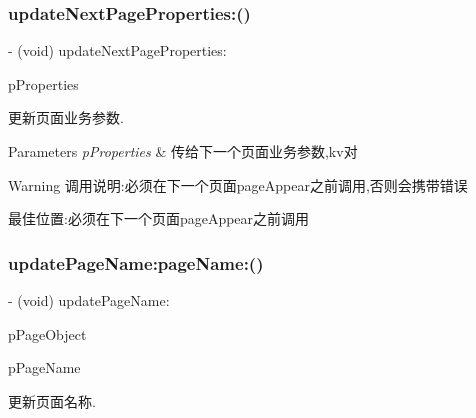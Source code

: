 \subsubsection{\texorpdfstring{update\+Next\+Page\+Properties\+:()}{updateNextPageProperties:()}}
{\footnotesize\ttfamily -\/ (void) update\+Next\+Page\+Properties\+: \begin{DoxyParamCaption}\item[{(N\+S\+Dictionary $\ast$)}]{p\+Properties }\end{DoxyParamCaption}}



更新页面业务参数. 


\begin{DoxyParams}{Parameters}
{\em p\+Properties} & 传给下一个页面业务参数,kv对\\
\hline
\end{DoxyParams}
\begin{DoxyWarning}{Warning}
调用说明\+:必须在下一个页面page\+Appear之前调用,否则会携带错误 \begin{DoxyVerb}                     最佳位置:必须在下一个页面pageAppear之前调用\end{DoxyVerb}
 
\end{DoxyWarning}
\mbox{\label{interface_u_t_tracker_af0b3ce3574a7cbf78cb880c567f9efa1}} 
\subsubsection{\texorpdfstring{update\+Page\+Name\+:page\+Name\+:()}{updatePageName:pageName:()}}
{\footnotesize\ttfamily -\/ (void) update\+Page\+Name\+: \begin{DoxyParamCaption}\item[{(id)}]{p\+Page\+Object }\item[{pageName:(N\+S\+String $\ast$)}]{p\+Page\+Name }\end{DoxyParamCaption}}



更新页面名称. 



